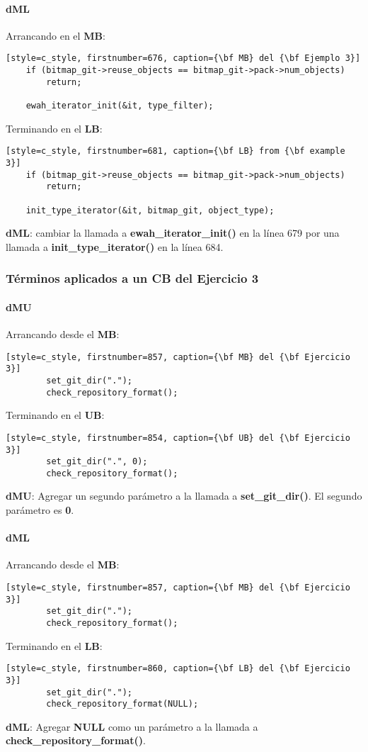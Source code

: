 \paragraph{dML}
Arrancando en el  {\bf MB}:
\begin{lstlisting}[style=c_style, firstnumber=676, caption={\bf MB} del {\bf Ejemplo 3}]
	if (bitmap_git->reuse_objects == bitmap_git->pack->num_objects)
		return;

	ewah_iterator_init(&it, type_filter);
\end{lstlisting}
Terminando en el {\bf LB}:
\begin{lstlisting}[style=c_style, firstnumber=681, caption={\bf LB} from {\bf example 3}]
	if (bitmap_git->reuse_objects == bitmap_git->pack->num_objects)
		return;

	init_type_iterator(&it, bitmap_git, object_type);
\end{lstlisting}
{\bf dML}: cambiar la llamada a {\bf ewah\_iterator\_init()} en la línea 679 por una llamada
a {\bf init\_type\_iterator()} en la línea 684.

\subsubsection{Términos aplicados a un CB del Ejercicio 3}
\paragraph{dMU}
Arrancando desde el {\bf MB}:
\begin{lstlisting}[style=c_style, firstnumber=857, caption={\bf MB} del {\bf Ejercicio 3}]
		set_git_dir(".");
		check_repository_format();
\end{lstlisting}
Terminando en el  {\bf UB}:
\begin{lstlisting}[style=c_style, firstnumber=854, caption={\bf UB} del {\bf Ejercicio 3}]
		set_git_dir(".", 0);
		check_repository_format();
\end{lstlisting}
{\bf dMU}: Agregar un segundo parámetro a la llamada a {\bf set\_git\_dir()}. El segundo parámetro es {\bf 0}.

\paragraph{dML}
Arrancando desde el {\bf MB}:
\begin{lstlisting}[style=c_style, firstnumber=857, caption={\bf MB} del {\bf Ejercicio 3}]
		set_git_dir(".");
		check_repository_format();
\end{lstlisting}
Terminando en el {\bf LB}:
\begin{lstlisting}[style=c_style, firstnumber=860, caption={\bf LB} del {\bf Ejercicio 3}]
		set_git_dir(".");
		check_repository_format(NULL);
\end{lstlisting}
{\bf dML}: Agregar {\bf NULL} como un parámetro a la llamada a {\bf check\_repository\_format()}.

